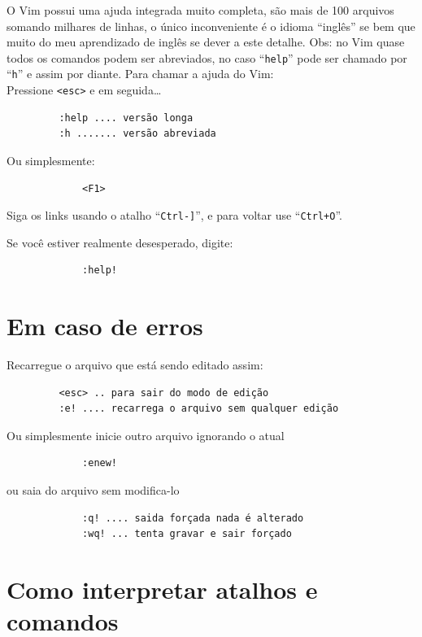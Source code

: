 \documentclass[10pt,a4paper,openany]{book}
\begin{document}
O Vim possui uma ajuda integrada muito completa, são mais de 100 arquivos
somando milhares de linhas, o único inconveniente é o idioma ``inglês'' se bem
que muito do meu aprendizado de inglês se dever a este detalhe.
Obs: no Vim quase todos os comandos podem ser abreviados, no caso
``\verb+help+'' pode ser chamado por ``\verb+h+'' e assim por diante.
Para chamar a ajuda do Vim:  \\

Pressione \verb|<esc>| e em seguida\dots

\begin{verbatim}
		 :help .... versão longa
		 :h ....... versão abreviada
\end{verbatim}

Ou simplesmente:

\begin{verbatim}
			 <F1>
\end{verbatim}

Siga os links usando o atalho ``\verb+Ctrl-]+'', e para voltar use
  ``\verb|Ctrl+O|''.

Se você estiver realmente desesperado, digite:

\begin{verbatim}
			 :help!
\end{verbatim}



\section{Em caso de erros }\label{Em caso de erros }
Recarregue o arquivo que está sendo editado assim:

\begin{verbatim}
		 <esc> .. para sair do modo de edição
		 :e! .... recarrega o arquivo sem qualquer edição
\end{verbatim}

Ou simplesmente inicie outro arquivo ignorando o atual

\begin{verbatim}
			 :enew!
\end{verbatim}

ou saia do arquivo sem modifica-lo

\begin{verbatim}
			 :q! .... saida forçada nada é alterado
			 :wq! ... tenta gravar e sair forçado
\end{verbatim}

\section{Como interpretar atalhos e comandos}\label{Como interpretar atalhos e comandos}
\end{document}
